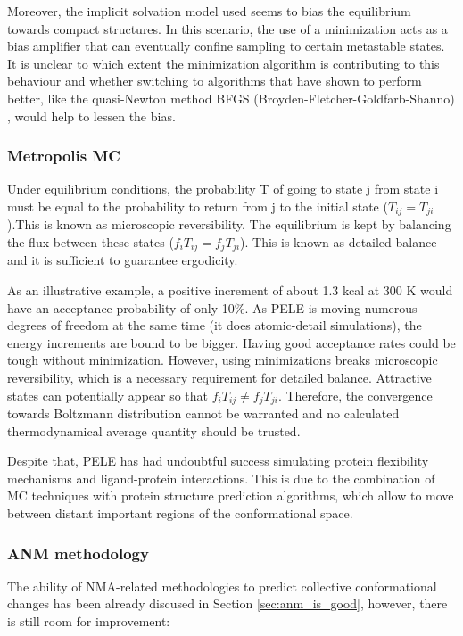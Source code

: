 Moreover, the implicit solvation model used seems to bias the equilibrium towards compact structures. In this scenario, the use of a minimization acts as a bias amplifier that can eventually confine sampling to certain metastable states. It is unclear to which extent the minimization algorithm is contributing to this behaviour and whether switching to algorithms that have shown to perform better, like the quasi-Newton method BFGS (Broyden-Fletcher-Goldfarb-Shanno) \cite{bakken_efficient_2002-1}, would help to lessen the bias.

\subsubsection{Metropolis MC}

Under equilibrium conditions, the probability T of going to state j from state i must be equal to the probability to return from j to the initial state ($ T_{ij} = T_{ji}$).This is known as microscopic reversibility. The equilibrium is kept by balancing the flux between these states ($f_i T_{ij} = f_j T_{ji}$). This is known as detailed balance and it is sufficient to guarantee ergodicity. 

As an illustrative example, a positive increment of about 1.3 kcal at 300 K would have an acceptance probability of only 10\%. As PELE is moving numerous degrees of freedom at the same time (it does atomic-detail simulations), the energy increments are bound to be bigger. Having good acceptance rates could be tough without minimization. However, using minimizations breaks microscopic reversibility, which is a necessary requirement for detailed balance. Attractive states can potentially appear so that $f_i T_{ij} \neq f_j T_{ji}$. Therefore, the convergence towards Boltzmann distribution cannot be warranted and no calculated thermodynamical average quantity should be trusted. 

Despite that, PELE has had undoubtful success simulating protein flexibility mechanisms and ligand-protein interactions. This is due to the combination of MC techniques with protein structure prediction algorithms, which allow to move between distant important regions of the conformational space. 

\subsubsection{ANM methodology}
\label{sec:anm_limi}

The ability of NMA-related methodologies to predict collective conformational changes has been already discused in Section \ref{sec:anm_is_good}, however, there is still room for improvement:

